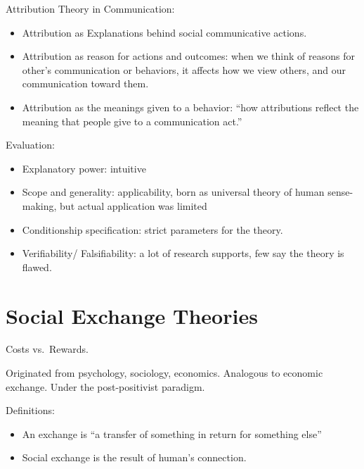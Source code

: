 \documentclass[
]{book}
\providecommand{\tightlist}{%
  \setlength{\itemsep}{0pt}\setlength{\parskip}{0pt}}
\begin{document}
Attribution Theory in Communication:

\begin{itemize}
\tightlist
\item
  Attribution as Explanations behind social communicative actions.\\
\item
  Attribution as reason for actions and outcomes: when we think of reasons for other's communication or behaviors, it affects how we view others, and our communication toward them.\\
\item
  Attribution as the meanings given to a behavior: ``how attributions reflect the meaning that people give to a communication act.''
\end{itemize}

Evaluation:

\begin{itemize}
\tightlist
\item
  Explanatory power: intuitive\\
\item
  Scope and generality: applicability, born as universal theory of human sense-making, but actual application was limited\\
\item
  Conditionship specification: strict parameters for the theory.\\
\item
  Verifiability/ Falsifiability: a lot of research supports, few say the theory is flawed.
\end{itemize}

\hypertarget{social-exchange-theories}{%
\section{Social Exchange Theories}\label{social-exchange-theories}}

Costs vs.~Rewards.

Originated from psychology, sociology, economics. Analogous to economic exchange. Under the post-positivist paradigm.

Definitions:

\begin{itemize}
\tightlist
\item
  An exchange is ``a transfer of something in return for something else'' \citep{Leffler_1982}\\
\item
  Social exchange is the result of human's connection.
\end{itemize}
\end{document}

